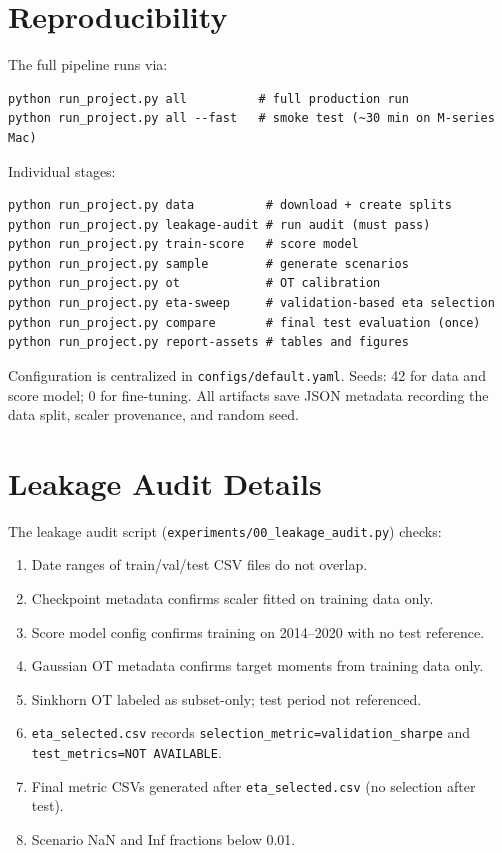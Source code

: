 \documentclass{article}
\begin{document}
\appendix

\section{Reproducibility}
\label{app:repro}

The full pipeline runs via:
\begin{verbatim}
python run_project.py all          # full production run
python run_project.py all --fast   # smoke test (~30 min on M-series Mac)
\end{verbatim}

Individual stages:
\begin{verbatim}
python run_project.py data          # download + create splits
python run_project.py leakage-audit # run audit (must pass)
python run_project.py train-score   # score model
python run_project.py sample        # generate scenarios
python run_project.py ot            # OT calibration
python run_project.py eta-sweep     # validation-based eta selection
python run_project.py compare       # final test evaluation (once)
python run_project.py report-assets # tables and figures
\end{verbatim}

Configuration is centralized in \texttt{configs/default.yaml}. Seeds: 42 for
data and score model; 0 for fine-tuning. All artifacts save JSON metadata
recording the data split, scaler provenance, and random seed.

\section{Leakage Audit Details}
\label{app:audit}

The leakage audit script (\texttt{experiments/00\_leakage\_audit.py}) checks:
\begin{enumerate}
  \item Date ranges of train/val/test CSV files do not overlap.
  \item Checkpoint metadata confirms scaler fitted on training data only.
  \item Score model config confirms training on 2014--2020 with no test reference.
  \item Gaussian OT metadata confirms target moments from training data only.
  \item Sinkhorn OT labeled as subset-only; test period not referenced.
  \item \texttt{eta\_selected.csv} records \texttt{selection\_metric=validation\_sharpe}
        and \texttt{test\_metrics=NOT AVAILABLE}.
  \item Final metric CSVs generated after \texttt{eta\_selected.csv} (no selection after test).
  \item Scenario NaN and Inf fractions below 0.01.
\end{enumerate}
\end{document}
